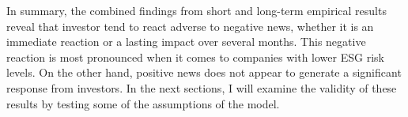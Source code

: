 In summary, the combined findings from short and long-term empirical results reveal that investor tend to react adverse to negative news, whether it is an immediate reaction or a lasting impact over several months. This negative reaction is most pronounced when it comes to companies with lower ESG risk levels. On the other hand, positive news does not appear to generate a significant response from investors. In the next sections, I will examine the validity of these results by testing some of the assumptions of the model. 